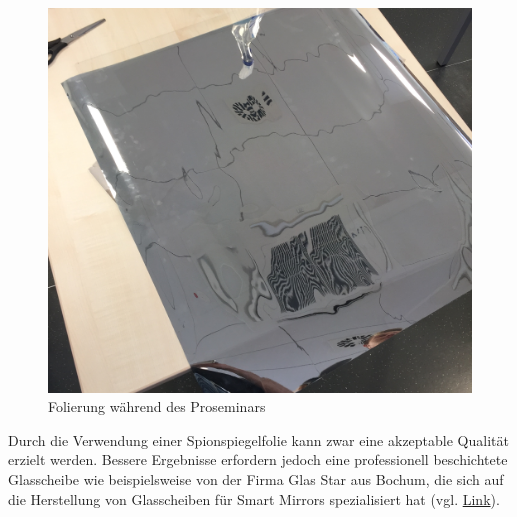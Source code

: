 \begin{figure}
		\includegraphics[scale=0.05]{bilder/spionspiegel.jpg}
		\caption{Folierung während des Proseminars}
		\label{fig:Folierung}
\end{figure}

Durch die Verwendung einer Spionspiegelfolie kann zwar eine akzeptable Qualität erzielt werden. Bessere Ergebnisse erfordern jedoch eine professionell beschichtete Glasscheibe wie beispielsweise von der Firma Glas Star aus Bochum, die sich auf die Herstellung von Glasscheiben für Smart Mirrors spezialisiert hat (vgl. \href{https://www.glas-star.de/spionspiegelnachmass/chrome-spy-spiegel/}{Link}). 	
	






